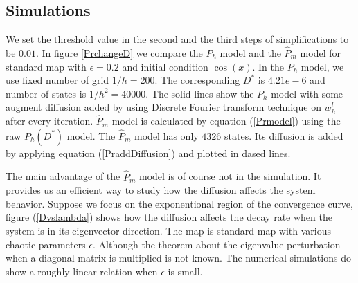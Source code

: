\documentclass{article}
\begin{document}
\subsection{Simulations}
We set the threshold value in the second and the third steps of simplifications
 to be $0.01$. In figure \ref{PrchangeD} we compare the $P_h$ model and the $\hat{P}_m$ model for
standard map with $\epsilon=0.2$ and initial condition $\cos(x)$. In the $P_h$ model, we use fixed number of grid $1/h = 200$.
The corresponding $D^*$ is $4.21e-6$ and number of states is $1/h^2 = 40000$. The solid lines show the $P_h$ model with some augment diffusion added by using
Discrete Fourier transform technique on $w_h^l$ after every iteration. $\hat{P}_m$ model is calculated by
equation (\ref{Prmodel}) using the raw $P_h(D^*)$ model. The $\hat{P}_m$ model has only $4326$ states. Its diffusion is added by applying equation (\ref{PraddDiffusion}) and plotted in dased lines.

The main advantage of the $\hat{P}_m$ model is of course not in the simulation. It provides us an efficient way to study how the diffusion affects the system behavior. Suppose we focus on the exponentional region of the convergence curve, figure (\ref{Dvslambda}) shows how the diffusion affects the decay rate when the system is in its eigenvector direction. The map is standard map with various chaotic parameters $\epsilon$. Although the theorem about the eigenvalue perturbation when a diagonal matrix is multiplied is not known. The numerical simulations do show a roughly linear relation when $\epsilon$ is small.
\end{document}
